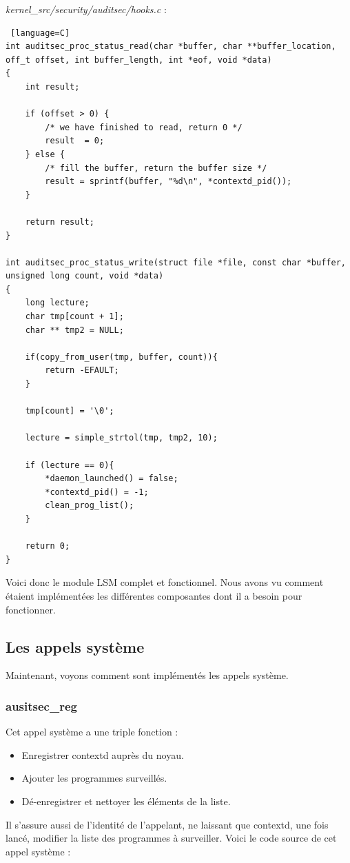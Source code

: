 \documentclass[pdftex,a4paper,titlepage,11pt]{article}
\begin{document}
\textit{{kernel\_src}/security/auditsec/hooks.c} :
\begin{lstlisting} [language=C]
int auditsec_proc_status_read(char *buffer, char **buffer_location,  off_t offset, int buffer_length, int *eof, void *data)
{
	int result;
	
	if (offset > 0) {
		/* we have finished to read, return 0 */
		result  = 0;
	} else {
		/* fill the buffer, return the buffer size */
		result = sprintf(buffer, "%d\n", *contextd_pid());
	}

	return result;
}

int auditsec_proc_status_write(struct file *file, const char *buffer, unsigned long count, void *data)
{
	long lecture;
	char tmp[count + 1];
	char ** tmp2 = NULL;

	if(copy_from_user(tmp, buffer, count)){ 
		return -EFAULT;
	}

	tmp[count] = '\0';

	lecture = simple_strtol(tmp, tmp2, 10);

	if (lecture == 0){
		*daemon_launched() = false;
		*contextd_pid() = -1;
		clean_prog_list();
	}

	return 0;
}
\end{lstlisting}

Voici donc le module LSM complet et fonctionnel. Nous avons vu comment étaient implémentées les différentes composantes dont il a besoin pour fonctionner.

\subsection{Les appels système}

Maintenant, voyons comment sont implémentés les appels système.

\subsubsection{ausitsec\_reg}

Cet appel système a une triple fonction :
\begin{itemize}
	\item Enregistrer contextd auprès du noyau.
	\item Ajouter les programmes surveillés.
	\item Dé-enregistrer et nettoyer les éléments de la liste. 
\end{itemize}

Il s'assure aussi de l'identité de l'appelant, ne laissant que contextd, une fois lancé, modifier la liste des programmes à surveiller. Voici le code source de cet appel système :
\end{document}
